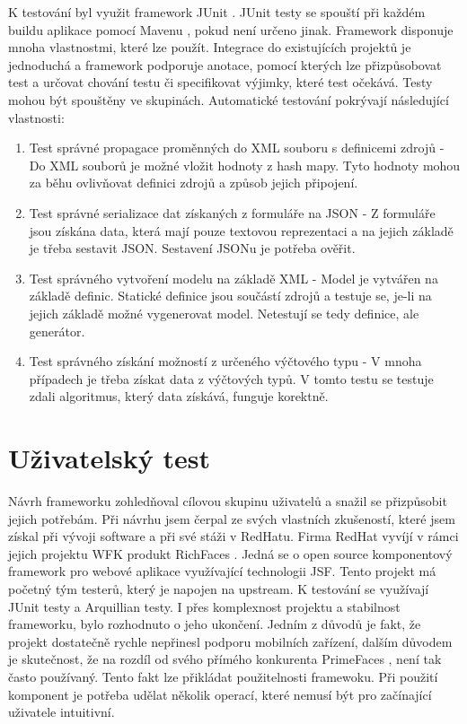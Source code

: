 K testování byl využit framework JUnit \cite{junit}. JUnit testy se spouští při každém buildu aplikace pomocí Mavenu \cite{maven}, pokud není určeno jinak. Framework disponuje mnoha vlastnostmi, které lze použít. Integrace do existujících projektů je jednoduchá a framework podporuje anotace, pomocí kterých lze přizpůsobovat test a určovat chování testu či specifikovat výjimky, které test očekává. Testy mohou být spouštěny ve skupinách. Automatické testování pokrývají následující vlastnosti:
\begin{enumerate}
\item Test správné propagace proměnných do XML souboru s definicemi zdrojů - Do XML souborů je možné vložit hodnoty z hash mapy. Tyto hodnoty mohou za běhu ovlivňovat definici zdrojů a způsob jejich připojení. 
\item Test správné serializace dat získaných z formuláře na JSON - Z formuláře jsou získána data, která mají pouze textovou reprezentaci a na jejich základě je třeba sestavit JSON. Sestavení JSONu je potřeba ověřit.
\item Test správného vytvoření modelu na základě XML - Model je vytvářen na základě definic. Statické definice jsou součástí zdrojů a testuje se, je-li na jejich základě možné vygenerovat model. Netestují se tedy definice, ale generátor.
\item Test správného získání možností z určeného výčtového typu - V mnoha případech je třeba získat data z výčtových typů. V tomto testu se testuje zdali algoritmus, který data získává, funguje korektně.
\end{enumerate}

\section{Uživatelský test}
Návrh frameworku zohledňoval cílovou skupinu uživatelů a snažil se přizpůsobit jejich potřebám. Při návrhu jsem čerpal ze svých vlastních zkušeností, které jsem získal při vývoji software a při své stáži v RedHatu. Firma RedHat vyvíjí v rámci jejich projektu WFK produkt RichFaces \cite{richfaces}. Jedná se o open source komponentový framework pro webové aplikace využívající technologii JSF. Tento projekt má početný tým testerů, který je napojen na upstream. K testování se využívají JUnit testy a Arquillian testy. I přes komplexnost projektu a stabilnost frameworku, bylo rozhodnuto o jeho ukončení. Jedním z důvodů je fakt, že projekt dostatečně rychle nepřinesl podporu mobilních zařízení, dalším důvodem je skutečnost, že na rozdíl od svého přímého konkurenta PrimeFaces \cite{primefaces}, není tak často používaný. Tento fakt lze přikládat použitelnosti framewoku. Při použití komponent je potřeba udělat několik operací, které nemusí být pro začínající uživatele intuitivní. 

